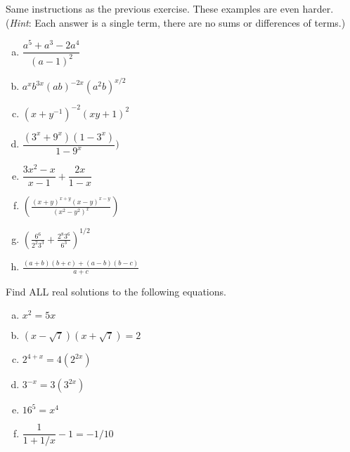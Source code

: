 \begin{exercise}{9}
Same instructions as the previous exercise. These examples are even harder. (\emph{Hint}: Each answer is a single term, there are no sums or differences of terms.)
\begin{multicols}{2}
\begin{enumerate}[(a)]
\item
$\dfrac{a^5 +a^3 - 2a^4}{(a-1)^2}$
\item
$a^x b^{3x}(ab)^{-2x}(a^2 b)^{x/2}$
\item
$(x+y^{-1})^{-2}(xy+1)^2$
\item
$\dfrac{(3^x+9^x)(1-3^x)}{1-9^x})$
\item
$\dfrac{3x^2 - x}{x-1} + \dfrac{2x}{1-x}$
\item
$\displaystyle{ \left(\frac{(x+y)^{x+y}(x-y)^{x-y}}{(x^2 - y^2)^x}\right)}$
\item
$ \displaystyle{\left( \frac{6^6}{2^2 3^3} +  \frac{2^8 3^6}{6^3}\right)^{1/2}} $
\item
$ \displaystyle{\frac{(a+b)(b+c) + (a-b)(b-c)}{a+c} }$

\end{enumerate}
\end{multicols}
\end{exercise}

\begin{exercise}{10}
Find ALL  real solutions to the following equations. 
\begin{multicols}{2}
\begin{enumerate}[(a)]
\item
$x^2 = 5x$
\item
$(x - \sqrt{7})(x+\sqrt{7}) = 2$
\item
$2^{4+x} = 4(2^{2x})$
\item
$3^{-x} = 3(3^{2x})$
\item
$16^5 = x^4$
\item
$\dfrac{1}{1 + 1/x} -1= -1/10$
\end{enumerate}
\end{multicols}
\end{exercise}

